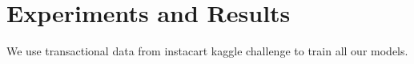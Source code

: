 \section{Experiments and Results}
We use transactional data from instacart kaggle challenge to train all our models.